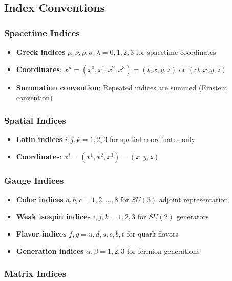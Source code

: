 \subsection{Index Conventions}

\subsubsection{Spacetime Indices}

\begin{itemize}
    \item \textbf{Greek indices} $\mu, \nu, \rho, \sigma, \lambda = 0, 1, 2, 3$ for spacetime coordinates
    \item \textbf{Coordinates}: $x^\mu = (x^0, x^1, x^2, x^3) = (t, x, y, z)$ or $(ct, x, y, z)$
    \item \textbf{Summation convention}: Repeated indices are summed (Einstein convention)
\end{itemize}

\subsubsection{Spatial Indices}

\begin{itemize}
    \item \textbf{Latin indices} $i, j, k = 1, 2, 3$ for spatial coordinates only
    \item \textbf{Coordinates}: $x^i = (x^1, x^2, x^3) = (x, y, z)$
\end{itemize}

\subsubsection{Gauge Indices}

\begin{itemize}
    \item \textbf{Color indices} $a, b, c = 1, 2, \ldots, 8$ for $SU(3)$ adjoint representation
    \item \textbf{Weak isospin indices} $i, j, k = 1, 2, 3$ for $SU(2)$ generators
    \item \textbf{Flavor indices} $f, g = u, d, s, c, b, t$ for quark flavors
    \item \textbf{Generation indices} $\alpha, \beta = 1, 2, 3$ for fermion generations
\end{itemize}

\subsubsection{Matrix Indices}

